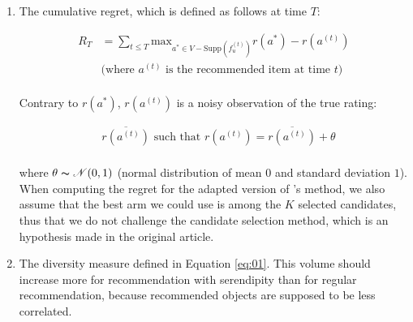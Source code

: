 \documentclass{article}
\begin{document}
\begin{enumerate}
\item The cumulative regret, which is defined as follows at time $T$:

\begin{equation}
\begin{split}
R_{T} & = \sum_{t \leq T} \text{max}_{a^{*} \in V-\text{Supp}(f^{(t)}_{u})} r(a^{*}) - r(a^{(t)})\\
& \mbox{(where $a^{(t)}$ is the recommended item at time $t$)}\\ 
\end{split}
\end{equation}

Contrary to $r(a^{*})$, $r(a^{(t)})$ is a noisy observation of the true rating:

\begin{equation}
\begin{split}
& \overline{r(a^{(t)})} \text{ such that } r(a^{(t)}) = \overline{r(a^{(t)})} + \theta\\
\end{split}
\end{equation}

where $\theta \thicksim \mathscr{N}(0, 1)$ (normal distribution of mean $0$ and standard deviation $1$). When computing the regret for the adapted version of \citet{lagree2017effective}'s method, we also assume that the best arm we could use is among the $K$ selected candidates, thus that we do not challenge the candidate selection method, which is an hypothesis made in the original article.

\item The diversity measure defined in Equation \ref{eq:01}. This volume should increase more for recommendation with serendipity than for regular recommendation, because recommended objects are supposed to be less correlated.

\end{enumerate}
\end{document}
